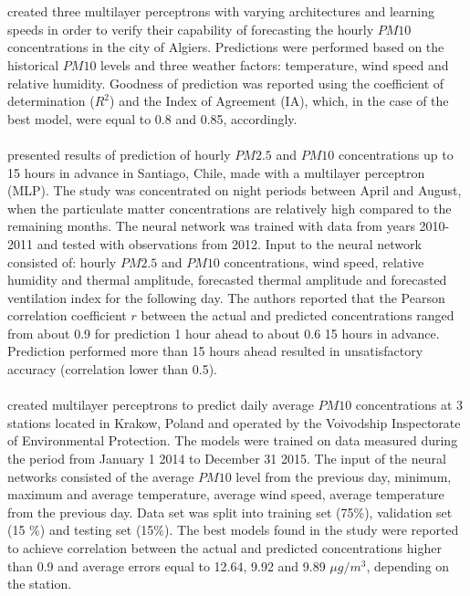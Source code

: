 \\\\
\cite{Chellali2016} created three multilayer perceptrons with varying architectures and learning speeds in order to verify their capability of forecasting the hourly $PM10$ concentrations in the city of Algiers. Predictions were performed based on the historical $PM10$ levels and three weather factors: temperature, wind speed and relative humidity. Goodness of prediction was reported using the coefficient of determination ($R^2$) and the Index of Agreement (IA), which, in the case of the best model, were equal to 0.8 and 0.85, accordingly.
\\\\
\cite{PEREZ201622} presented results of prediction of hourly $PM2.5$ and $PM10$ concentrations up to 15 hours in advance in Santiago, Chile, made with a multilayer perceptron (MLP). The study was concentrated on night periods between April and August, when the particulate matter concentrations are relatively high compared to the remaining months. The neural network was trained with data from years 2010-2011 and tested with observations from 2012. Input to the neural network consisted of: hourly $PM2.5$ and $PM10$ concentrations, wind speed, relative humidity and thermal amplitude, forecasted thermal amplitude and forecasted ventilation index for the following day. The authors reported that the Pearson correlation coefficient $r$ between the actual and predicted concentrations ranged from about 0.9 for prediction 1 hour ahead to about 0.6 15 hours in advance. Prediction performed more than 15 hours ahead resulted in unsatisfactory accuracy (correlation lower than 0.5).
\\\\
\cite{Pawul2016} created multilayer perceptrons to predict daily average $PM10$ concentrations at 3 stations located in Krakow, Poland and operated by the Voivodship Inspectorate of Environmental Protection. The models were trained on data measured during the period from January 1 2014 to December 31 2015. The input of the neural networks consisted of the average $PM10$ level from the previous day, minimum, maximum and average temperature, average wind speed, average temperature from the previous day. Data set was split into training set (75\%), validation set (15 \%) and testing set (15\%). The best models found in the study were reported to achieve correlation between the actual and predicted concentrations higher than 0.9 and average errors equal to 12.64, 9.92 and 9.89 $\mu g / m^3$, depending on the station.
